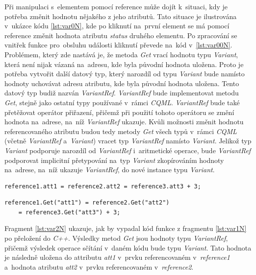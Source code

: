 \documentclass[11pt,twoside,a4paper]{book}
\begin{document}
Při manipulaci s~elementem pomocí reference může dojít k~situaci, kdy je potřeba změnit hodnotu nějakého z jeho atributů. Tato situace je ilustrována v~ukázce kódu \ref{lst:var0N}, kde po kliknutí na~první element se má pomocí reference změnit hodnota atributu \textit{status} druhého elementu. Po zpracování se vnitřek funkce pro~obsluhu události kliknutí převede na~kód v~\ref{lst:var00N}. Problémem, který zde nastává je, že metoda \textit{Get} vrací hodnotu typu \textit{Variant}, která není nijak vázaná na~adresu, kde byla původní hodnota uložena. Proto je potřeba vytvořit další datový typ, který narozdíl od typu \textit{Variant} bude namísto hodnoty uchovávat adresu atributu, kde byla původní hodnota uložena. Tento datový typ budiž nazván \textit{VariantRef}. \textit{VariantRef} bude implementovat metodu \textit{Get}, stejně jako ostatní typy používané v~rámci \textit{CQML}. \textit{VariantRef} bude také přetěžovat operátor přiřazení, přičemž při použití tohoto operátoru se změní hodnota na~adrese, na~níž \textit{VariantRef} ukazuje. Kvůli možnosti změnit hodnotu referencovaného atributu budou tedy metody \textit{Get} všech typů v~rámci \textit{CQML} (včetně \textit{VariantRef} a~\textit{Variant}) vracet typ \textit{VariantRef} namísto \textit{Variant}. Jelikož typ \textit{Variant} podporuje narozdíl od \textit{VariantRef} i~aritmetické operace, bude \textit{VariantRef} podporovat implicitní přetypování na~typ \textit{Variant} zkopírováním hodnoty na~adrese, na~níž ukazuje \textit{VariantRef}, do nové instance typu \textit{Variant}.\\


\begin{lstlisting}[frame=single,caption=Řádek \textit{CQML} kódu ilustrující přístup k~atributům elementů uložených v~referenci.,label=lst:var1N]
reference1.att1 = reference2.att2 = reference3.att3 + 3;
\end{lstlisting}

\begin{lstlisting}[frame=single,caption=Kód ilustrující operace s~typy \textit{Variant} a~\textit{VariantRef}. ,label=lst:var2N]
reference1.Get("att1") = reference2.Get("att2") 
	= reference3.Get("att3") + 3;
\end{lstlisting}
Fragment \ref{lst:var2N} ukazuje, jak by vypadal kód funkce z fragmentu \ref{lst:var1N} po přeložení do \textit{C++}. Výsledky metod \textit{Get} jsou hodnoty typu \textit{VariantRef}, přičemž výsledek operace sčítání v~daném kódu bude typu \textit{Variant}. Tato hodnota je následně uložena do attributu \textit{att1} v~prvku referencovaném v~\textit{reference1} a~hodnota atributu \textit{att2} v~prvku referencovaném v~\textit{reference2}.\\
\end{document}
